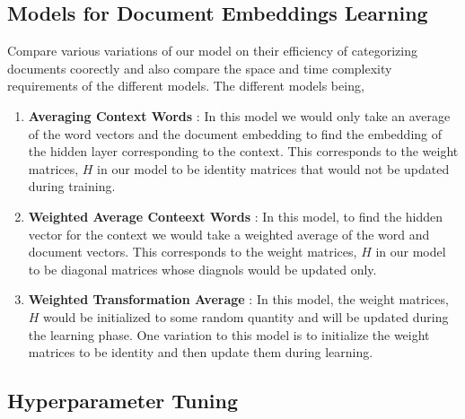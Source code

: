 \documentclass{article}
\begin{document}
\subsection{Models for Document Embeddings Learning}
Compare various variations of our model on their efficiency of categorizing documents coorectly and also compare the space and time complexity requirements of the different models. The different models being, 
\begin{enumerate}
\item \textbf{Averaging Context Words} : In this model we would only take an average of the word vectors and the document embedding to find the embedding of the hidden layer corresponding to the context. This corresponds to the weight matrices, $H$ in our model to be identity matrices that would not be updated during training.

\item \textbf{Weighted Average Conteext Words} : In this model, to find the hidden vector for the context we would take a weighted average of the word and document vectors. This corresponds to the weight matrices, $H$ in our model to be diagonal matrices whose diagnols would be updated only.

\item \textbf{Weighted Transformation Average} : In this model, the weight matrices, $H$ would be initialized to some random quantity and will be updated during the learning phase. One variation to this model is to initialize the weight matrices to be identity and then update them during learning.

\end{enumerate}

\subsection{Hyperparameter Tuning}
\end{document}
